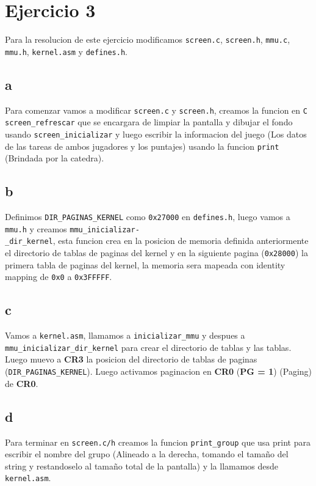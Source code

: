 \section{Ejercicio 3}

Para la resolucion de este ejercicio modificamos \texttt{screen.c}, \texttt{screen.h}, \texttt{mmu.c}, \texttt{mmu.h}, \texttt{kernel.asm} y \texttt{defines.h}.

\subsection{a}
Para comenzar vamos a modificar \texttt{screen.c} y \texttt{screen.h}, creamos la funcion en \texttt{C} \texttt{screen\_refrescar} que se encargara de limpiar la pantalla y dibujar el fondo usando \texttt{screen\_inicializar} y luego escribir la informacion del juego (Los datos de las tareas de ambos jugadores y los puntajes) usando la funcion \texttt{print} (Brindada por la catedra).

\subsection{b}
Definimos \texttt{DIR\_PAGINAS\_KERNEL} como \texttt{0x27000} en \texttt{defines.h}, luego vamos a \texttt{mmu.h} y creamos \texttt{mmu\_inicializar-}\\
\texttt{\_dir\_kernel}, esta funcion crea en la posicion de memoria definida anteriormente el directorio de tablas de paginas del kernel y en la siguiente pagina (\texttt{0x28000}) la primera tabla de paginas del kernel, la memoria sera mapeada con identity mapping de \texttt{0x0} a \texttt{0x3FFFFF}.

\subsection{c}
Vamos a \texttt{kernel.asm}, llamamos a \texttt{inicializar\_mmu} y despues a \texttt{mmu\_inicializar\_dir\_kernel} para crear el directorio de tablas y las tablas. Luego muevo a \textbf{CR3} la posicion del directorio de tablas de paginas (\texttt{DIR\_PAGINAS\_KERNEL}). Luego activamos paginacion en \textbf{CR0} (\textbf{PG = 1}) (Paging) de \textbf{CR0}.

\subsection{d}
Para terminar en \texttt{screen.c/h} creamos la funcion \texttt{print\_group} que usa print para escribir el nombre del grupo (Alineado a la derecha, tomando el tamaño del string y restandoselo al tamaño total de la pantalla) y la llamamos desde \texttt{kernel.asm}.